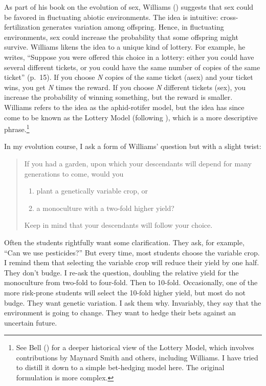 \documentclass[
  letterpaper,
]{book}
\providecommand{\tightlist}{%
  \setlength{\itemsep}{0pt}\setlength{\parskip}{0pt}}\usepackage{longtable,booktabs,array}
\begin{document}
As part of his book on the evolution of sex, Williams
() suggests that sex could be favored
in fluctuating abiotic environments. The idea is intuitive:
cross-fertilization generates variation among offspring. Hence, in
fluctuating environments, sex could increase the probability that some
offspring might survive. Williams likens the idea to a unique kind of
lottery. For example, he writes, ``Suppose you were offered this choice
in a lottery: either you could have several different tickets, or you
could have the same number of copies of the same ticket'' (p.~15). If
you choose \emph{N} copies of the same ticket (asex) and your ticket
wins, you get \emph{N} times the reward. If you choose \emph{N}
different tickets (sex), you increase the probability of winning
something, but the reward is smaller. Williams refers to the idea as the
aphid-rotifer model, but the idea has since come to be known as the
Lottery Model (following ), which is
a more descriptive phrase.\footnote{See Bell
  () for a deeper historical view of the
  Lottery Model, which involves contributions by Maynard Smith and
  others, including Williams. I have tried to distill it down to a
  simple bet-hedging model here. The original formulation is more
  complex.}

In my evolution course, I ask a form of Williams' question but with a
slight twist:

\begin{quote}
If you had a garden, upon which your descendants will depend for many
generations to come, would you

\begin{enumerate}
\def\labelenumi{\arabic{enumi}.}
\tightlist
\item
  plant a genetically variable crop, or
\item
  a monoculture with a two-fold higher yield?
\end{enumerate}

Keep in mind that your descendants will follow your choice.
\end{quote}

Often the students rightfully want some clarification. They ask, for
example, ``Can we use pesticides?'' But every time, most students choose
the variable crop. I remind them that selecting the variable crop will
reduce their yield by one half. They don't budge. I re-ask the question,
doubling the relative yield for the monoculture from two-fold to
four-fold. Then to 10-fold. Occasionally, one of the more risk-prone
students will select the 10-fold higher yield, but most do not budge.
They want genetic variation. I ask them why. Invariably, they say that
the environment is going to change. They want to hedge their bets
against an uncertain future.
\end{document}

